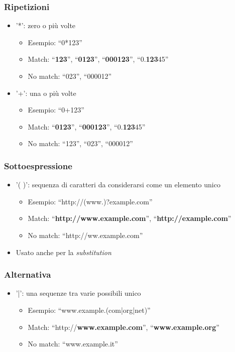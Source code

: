 \documentclass[xetex,table]{beamer}
\begin{document}
\begin{frame}
  \frametitle{Ripetizioni}
  \begin{itemize}
  \item '*': zero o più volte
    \begin{itemize}
    \item Esempio: ``0*123''
    \item Match: ``{\bf 123}'', ``{\bf 0123}'', ``{\bf 000123}'', ``0.{\bf 123}45''
    \item No match: ``023'', ``000012''
    \end{itemize}
  \item '+': una o più volte
    \begin{itemize}
    \item Esempio: ``0+123''
    \item Match: ``{\bf 0123}'', ``{\bf 000123}'', ``0.{\bf 123}45''
    \item No match: ``123'', ``023'', ``000012''
    \end{itemize}
  \end{itemize}
\end{frame}

\begin{frame}
  \frametitle{Sottoespressione}
  \begin{itemize}
  \item '( )': sequenza di caratteri da considerarsi come un elemento
    unico
    \begin{itemize}
    \item Esempio: ``http://(www.)?example.com''
    \item Match: ``{\bf http://www.example.com}'', ``{\bf http://example.com}''
    \item No match: ``http://ww.example.com''
    \end{itemize}
    \item Usato anche per la {\em substitution}
  \end{itemize}
\end{frame}

\begin{frame}
  \frametitle{Alternativa}
  \begin{itemize}
  \item '|': una sequenze tra varie possibili
    unico
    \begin{itemize}
    \item Esempio: ``www.example.(com|org|net)''
    \item Match: ``http://{\bf www.example.com}'', ``{\bf www.example.org}''
    \item No match: ``www.example.it''
    \end{itemize}
  \end{itemize}
\end{frame}
\end{document}
